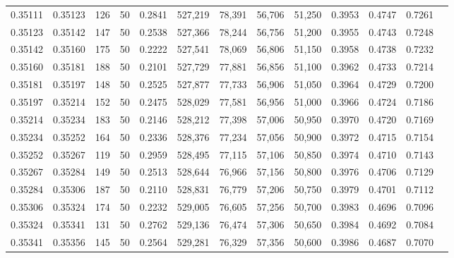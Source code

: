 \begin{tabular}{rrrrrrrrrrrrr}
0.35111 & 0.35123 &   126 &  50 &                                     0.2841 & 527,219 &  78,391 &  56,706 &  51,250 & 0.3953 & 0.4747 & 0.7261 \\
0.35123 & 0.35142 &   147 &  50 &                                     0.2538 & 527,366 &  78,244 &  56,756 &  51,200 & 0.3955 & 0.4743 & 0.7248 \\
0.35142 & 0.35160 &   175 &  50 &                                     0.2222 & 527,541 &  78,069 &  56,806 &  51,150 & 0.3958 & 0.4738 & 0.7232 \\
0.35160 & 0.35181 &   188 &  50 &                                     0.2101 & 527,729 &  77,881 &  56,856 &  51,100 & 0.3962 & 0.4733 & 0.7214 \\
0.35181 & 0.35197 &   148 &  50 &                                     0.2525 & 527,877 &  77,733 &  56,906 &  51,050 & 0.3964 & 0.4729 & 0.7200 \\
0.35197 & 0.35214 &   152 &  50 &                                     0.2475 & 528,029 &  77,581 &  56,956 &  51,000 & 0.3966 & 0.4724 & 0.7186 \\
0.35214 & 0.35234 &   183 &  50 &                                     0.2146 & 528,212 &  77,398 &  57,006 &  50,950 & 0.3970 & 0.4720 & 0.7169 \\
0.35234 & 0.35252 &   164 &  50 &                                     0.2336 & 528,376 &  77,234 &  57,056 &  50,900 & 0.3972 & 0.4715 & 0.7154 \\
0.35252 & 0.35267 &   119 &  50 &                                     0.2959 & 528,495 &  77,115 &  57,106 &  50,850 & 0.3974 & 0.4710 & 0.7143 \\
0.35267 & 0.35284 &   149 &  50 &                                     0.2513 & 528,644 &  76,966 &  57,156 &  50,800 & 0.3976 & 0.4706 & 0.7129 \\
0.35284 & 0.35306 &   187 &  50 &                                     0.2110 & 528,831 &  76,779 &  57,206 &  50,750 & 0.3979 & 0.4701 & 0.7112 \\
0.35306 & 0.35324 &   174 &  50 &                                     0.2232 & 529,005 &  76,605 &  57,256 &  50,700 & 0.3983 & 0.4696 & 0.7096 \\
0.35324 & 0.35341 &   131 &  50 &                                     0.2762 & 529,136 &  76,474 &  57,306 &  50,650 & 0.3984 & 0.4692 & 0.7084 \\
0.35341 & 0.35356 &   145 &  50 &                                     0.2564 & 529,281 &  76,329 &  57,356 &  50,600 & 0.3986 & 0.4687 & 0.7070 \\

\end{tabular}
